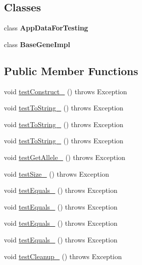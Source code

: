\subsection*{Classes}
\begin{DoxyCompactItemize}
\item 
class {\bfseries App\-Data\-For\-Testing}
\item 
class {\bfseries Base\-Gene\-Impl}
\end{DoxyCompactItemize}
\subsection*{Public Member Functions}
\begin{DoxyCompactItemize}
\item 
void \hyperlink{classorg_1_1jgap_1_1_base_gene_test_a8e52d151cf5b8df62a727d2b904be58c}{test\-Construct\-\_} ()  throws Exception 
\item 
void \hyperlink{classorg_1_1jgap_1_1_base_gene_test_a0f40cae2a08a312d2a151cce68b9b6b9}{test\-To\-String\-\_} ()  throws Exception 
\item 
void \hyperlink{classorg_1_1jgap_1_1_base_gene_test_aead7ff4df4c451b9651c71d5511448fb}{test\-To\-String\-\_} ()  throws Exception 
\item 
void \hyperlink{classorg_1_1jgap_1_1_base_gene_test_adc93f7f406a22a00b578002e99a22fcb}{test\-To\-String\-\_} ()  throws Exception 
\item 
void \hyperlink{classorg_1_1jgap_1_1_base_gene_test_a455a90298c73ab7d52e5e559ba3710de}{test\-Get\-Allele\-\_} ()  throws Exception 
\item 
void \hyperlink{classorg_1_1jgap_1_1_base_gene_test_a73d2f1e2216984439d5d81aab9354d3f}{test\-Size\-\_} ()  throws Exception 
\item 
void \hyperlink{classorg_1_1jgap_1_1_base_gene_test_a1606c51e50a973ac47f4b94b99c1b6a4}{test\-Equals\-\_} ()  throws Exception 
\item 
void \hyperlink{classorg_1_1jgap_1_1_base_gene_test_af0654ebf43db9b60b2f55e557b6ff5b5}{test\-Equals\-\_} ()  throws Exception 
\item 
void \hyperlink{classorg_1_1jgap_1_1_base_gene_test_a3435dca715dbf596e3c2923bc0e4ebfd}{test\-Equals\-\_} ()  throws Exception 
\item 
void \hyperlink{classorg_1_1jgap_1_1_base_gene_test_a8e859f6d03d8eb3ce5dfe926d11eed92}{test\-Equals\-\_} ()  throws Exception 
\item 
void \hyperlink{classorg_1_1jgap_1_1_base_gene_test_a09d667a803f0e86c783f702c2e42d4fa}{test\-Cleanup\-\_} ()  throws Exception 

\end{DoxyCompactItemize}
